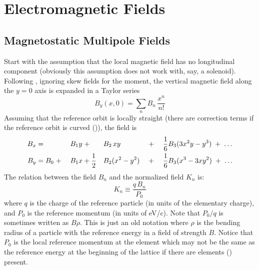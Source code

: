 \chapter{Electromagnetic Fields}
\label{c:em.fields}

\section{Magnetostatic Multipole Fields}
\label{s:mag.field}

Start with the assumption that the local magnetic field has no longitudinal component
(obviously this assumption does not work with, say, a solenoid).  Following \mad, ignoring
skew fields for the moment, the vertical magnetic field along the $y = 0$ axis is expanded
in a Taylor series
\begin{equation}
  B_y(x, 0) = \sum_n B_n \, \frac{x^n}{n!}
  \label{byx0b}
\end{equation}
Assuming that the reference orbit is locally straight (there are correction terms if the
reference orbit is curved ()), the field is
\begin{alignat}{5}
  B_x &=           &&B_1 y \; + \;         &&B_2 \, xy       
                   && \; + \; && \frac{1}{6} B_3 (3x^2 y - y^3) \; + \; \ldots \nonumber \\
  B_y &= B_0 \; + \; &&B_1 x + \frac{1}{2} &&B_2 (x^2 - y^2) 
                   && \; + \; && \frac{1}{6} B_3 (x^3 - 3x y^2) \; + \; \ldots
  \label{bbb}
\end{alignat}
The relation between the field $B_n$ and the normalized field $K_n$ is:
\begin{equation}
  K_n \equiv \frac{q \, B_n}{P_0}
  \label{kqlbp}
\end{equation}
where $q$ is the charge of the reference particle (in units of the elementary charge), and $P_0$ is
the reference momentum (in units of eV/c).  Note that $P_0/q$ is sometimes written as $B\rho$. This
is just an old notation where $\rho$ is the bending radius of a particle with the reference energy
in a field of strength $B$. Notice that $P_0$ is the local reference momentum at the element which
may not be the same as the reference energy at the beginning of the lattice if there are
 elements () present.

